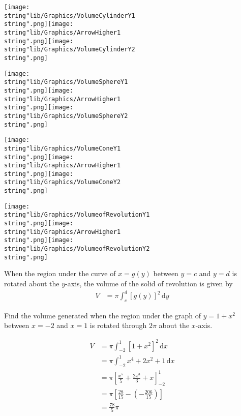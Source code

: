 \documentclass[11pt,a4paper]{book}
\begin{document}
\texttt{[image: \\string"lib/Graphics/VolumeCylinderY1\\string".png]}\hspace{1cm}\texttt{[image: \\string"lib/Graphics/ArrowHigher1\\string".png]}\hspace{1cm}\texttt{[image: \\string"lib/Graphics/VolumeCylinderY2\\string".png]}

\texttt{[image: \\string"lib/Graphics/VolumeSphereY1\\string".png]}\hspace{1cm}\texttt{[image: \\string"lib/Graphics/ArrowHigher1\\string".png]}\hspace{1cm}\texttt{[image: \\string"lib/Graphics/VolumeSphereY2\\string".png]}

\texttt{[image: \\string"lib/Graphics/VolumeConeY1\\string".png]}\hspace{1cm}\texttt{[image: \\string"lib/Graphics/ArrowHigher1\\string".png]}\hspace{1cm}\texttt{[image: \\string"lib/Graphics/VolumeConeY2\\string".png]}

\texttt{[image: \\string"lib/Graphics/VolumeofRevolutionY1\\string".png]}\hspace{1cm}\texttt{[image: \\string"lib/Graphics/ArrowHigher1\\string".png]}\hspace{1cm}\texttt{[image: \\string"lib/Graphics/VolumeofRevolutionY2\\string".png]}

\begin{tcolorbox}[colback=blue!5, colframe=black, boxrule=.4pt, sharpish corners]
When the region under the curve of $x=g(y)$ between $y=c$ and $y=d$ is rotated about the $y$-axis, the volume of the solid of revolution is given by
\begin{align*} V & =\pi\int_{c}^{d}[g(y)]^{2}\,\mathrm{d}y \end{align*}
\end{tcolorbox}

\newpage{}

\begin{example}

Find the volume generated when the region under the graph of $y=1+x^{2}$
between $x=-2$ and $x=1$ is rotated through $2\pi$ about the $x$-axis.

\Solution

\begin{align*}
V & =\pi\int_{-2}^{1}\left[1+x^{2}\right]^{2}\,\mathrm{d}x\\
 & =\pi\int_{-2}^{1}x^{4}+2x^{2}+1\,\mathrm{d}x\\
 & =\pi\left[\frac{x^{5}}{5}+\frac{2x^{3}}{3}+x\right]_{-2}^{1}\\
 & =\pi\left[\frac{28}{15}-\left(-\frac{206}{15}\right)\right]\\
 & =\frac{78}{5}\pi
\end{align*}

\end{example}
\end{document}
